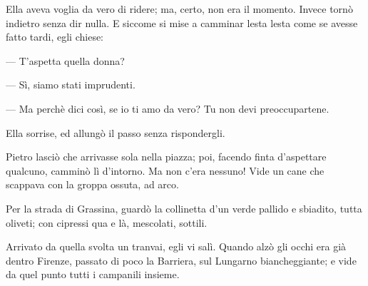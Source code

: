 Ella aveva voglia da vero di ridere; ma, certo, non era il momento. Invece tornò indietro senza dir nulla. E siccome si mise a camminar lesta lesta come se avesse fatto tardi, egli chiese:

— T'aspetta quella donna?

— Sì, siamo stati imprudenti.

— Ma perchè dici così, se io ti amo da vero? Tu non devi preoccupartene.

Ella sorrise, ed allungò il passo senza rispondergli.

Pietro lasciò che arrivasse sola nella piazza; poi, facendo finta d'aspettare qualcuno, camminò lì d'intorno. Ma non c'era nessuno! Vide un cane che scappava con la groppa ossuta, ad arco.

Per la strada di Grassina, guardò la collinetta d'un verde pallido e sbiadito, tutta oliveti; con cipressi qua e là, mescolati, sottili.

Arrivato da quella svolta un tranvai, egli vi salì. Quando alzò gli occhi era già dentro Firenze, passato di poco la Barriera, sul Lungarno biancheggiante; e vide da quel punto tutti i campanili insieme.
